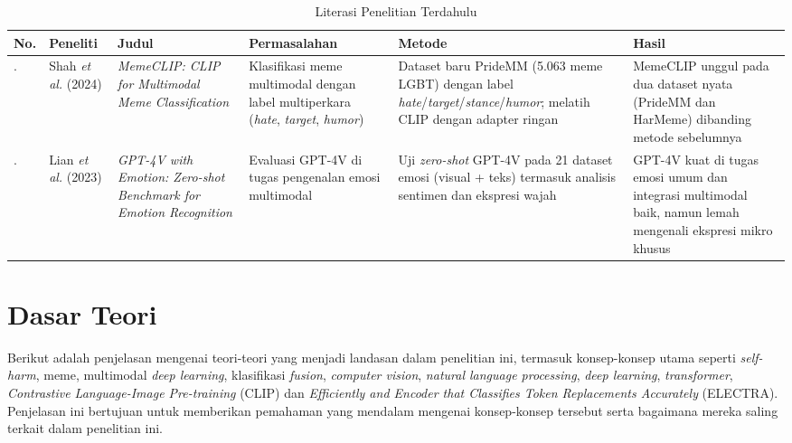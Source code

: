 \begin{landscape}
\vspace*{1cm}
\begin{table}[H]
    \centering
    \caption{Literasi Penelitian Terdahulu}
    \label{table:2.literasi.2}
    \small
    \setlength{\tabcolsep}{4pt}
    \renewcommand{\arraystretch}{1.2}
    \begin{tabular}{>{\raggedright\arraybackslash}m{0.4cm} >{\raggedright\arraybackslash}m{1.6cm} >{\raggedright\arraybackslash}m{3cm} >{\raggedright\arraybackslash}m{2.8cm} >{\raggedright\arraybackslash}m{3cm} >{\raggedright\arraybackslash}m{3.8cm}}
        \hline
        \textbf{No.} & \textbf{Peneliti} & \textbf{Judul} & \textbf{Permasalahan} & \textbf{Metode} & \textbf{Hasil} \\
        \hline
        4. & Shah \textit{et al.} (2024) \cite{shah2024memeclip} & \textit{MemeCLIP: CLIP for Multimodal Meme Classification} & Klasifikasi meme multimodal dengan label multiperkara (\textit{hate}, \textit{target}, \textit{humor}) & Dataset baru PrideMM (5.063 meme LGBT) dengan label \textit{hate}/\textit{target}/\textit{stance}/\textit{humor}; melatih CLIP dengan adapter ringan & MemeCLIP unggul pada dua dataset nyata (PrideMM dan HarMeme) dibanding metode sebelumnya \\
        \hline
        5. & Lian \textit{et al.} (2023) \cite{lian2023gpt4v} & \textit{GPT-4V with Emotion: Zero-shot Benchmark for Emotion Recognition} & Evaluasi GPT-4V di tugas pengenalan emosi multimodal & Uji \textit{zero-shot} GPT-4V pada 21 dataset emosi (visual + teks) termasuk analisis sentimen dan ekspresi wajah & GPT-4V kuat di tugas emosi umum dan integrasi multimodal baik, namun lemah mengenali ekspresi mikro khusus \\
        \hline
    \end{tabular}
\end{table}
\end{landscape}




\section{Dasar Teori} \label{II.teori}
Berikut adalah penjelasan mengenai teori-teori yang menjadi landasan dalam penelitian ini, termasuk konsep-konsep utama seperti \textit{self-harm}, meme, multimodal \textit{deep learning}, klasifikasi \textit{fusion}, \textit{computer vision}, \textit{natural language processing}, \textit{deep learning}, \textit{transformer}, \textit{Contrastive Language-Image Pre-training} (CLIP) dan \textit{Efficiently and Encoder that Classifies Token Replacements Accurately} (ELECTRA). Penjelasan ini bertujuan untuk memberikan pemahaman yang mendalam mengenai konsep-konsep tersebut serta bagaimana mereka saling terkait dalam penelitian ini.

